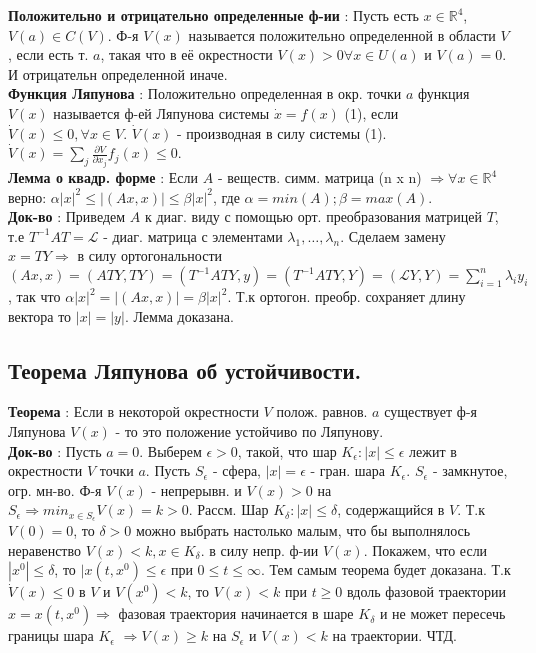 \documentclass[unicode, 8pt, a4paper,oneside, landscape]{article}
\begin{document}
\begin{multicols}{4}
{\bf Положительно и отрицательно определенные ф-ии} : Пусть есть $x \in \mathbb{R}^4$, $V(a) \in C(V)$. Ф-я $V(x)$ называется положительно определенной в области $V$, если есть т. $a$, такая что в её окрестности $V(x) > 0 \forall x \in U(a)$ и $V(a) = 0$. И отрицательн определенной иначе.\\
{\bf Функция Ляпунова} : Положительно определенная в окр. точки $a$ функция $V(x)$ называется ф-ей Ляпунова системы $\dot{x} = f(x)$ (1), если $\dot{V}(x) \leq 0, \forall x \in V$. $\dot{V}(x)$ - производная в силу системы (1). $\dot{V}(x) = \sum_j \frac{\partial V}{\partial x_j} f_j(x) \leq 0$.\\
{\bf Лемма о квадр. форме} : Если $A$ - веществ. симм. матрица (n x n) $\Rightarrow \forall x \in \mathbb{R}^4$ верно: $\alpha |x|^2 \leq |(Ax, x)| \leq \beta |x|^2$, где $\alpha = min(A); \beta = max(A)$.\\
{\bf Док-во} : Приведем $A$ к диаг. виду с помощью орт. преобразования  матрицей $T$, т.е $T^{-1}AT = \mathcal{L}$ - диаг. матрица с элементами $\lambda_1, \ldots, \lambda_n$. Сделаем замену $x =TY \Rightarrow$ в силу ортогональности $(Ax, x) = (ATY, TY) = (T^{-1}ATY, y) = (T^{-1}ATY, Y) = (\mathcal{L}Y, Y) = \sum_{i=1}^n \lambda_iy_i$, так что $\alpha |x|^2 = |(Ax, x)| = \beta |x|^2$. Т.к ортогон. преобр. сохраняет длину вектора то $|x| = |y|$. Лемма доказана.  


\subsection{Теорема Ляпунова об устойчивости.}
{\bf Теорема} : Если в некоторой окрестности $V$ полож. равнов. $a$ существует ф-я Ляпунова $V(x)$ - то это положение устойчиво по Ляпунову.\\
{\bf Док-во} : Пусть $a=0$. Выберем $\epsilon > 0$, такой, что шар $K_{\epsilon} : |x| \leq \epsilon$ лежит в окрестности $V$ точки $a$. Пусть $S_{\epsilon}$ - сфера, $|x| = \epsilon$ - гран. шара $K_\epsilon$. $S_\epsilon$ - замкнутое, огр. мн-во. Ф-я $V(x)$ - непрерывн. и $V(x) > 0$ на $S_\epsilon \Rightarrow min_{x \in S_\epsilon} V(x) = k > 0$. Рассм. Шар $K_\delta : |x| \leq \delta$, содержащийся в $V$. Т.к $V(0) = 0$, то $\delta > 0$ можно выбрать настолько малым, что бы выполнялось неравенство $V(x) < k, x \in K_\delta$. в силу непр. ф-ии $V(x)$. Покажем, что если $|x^0| \leq \delta$, то $|x(t, x^0) \leq \epsilon$ при $0 \leq t \leq \infty$. Тем самым теорема будет доказана.  Т.к $\dot{V}(x) \leq 0$ в $V$ и $V(x^0) < k$, то $V(x) < k$ при $t \geq 0$ вдоль фазовой траектории $x = x(t, x^0) \Rightarrow$ фазовая траектория начинается в шаре $K_\delta$ и не может пересечь границы шара $K_\epsilon$ $\Rightarrow V(x) \geq k$ на $S_\epsilon$ и $V(x) < k$ на траектории. ЧТД.


\end{multicols}
\end{document}

